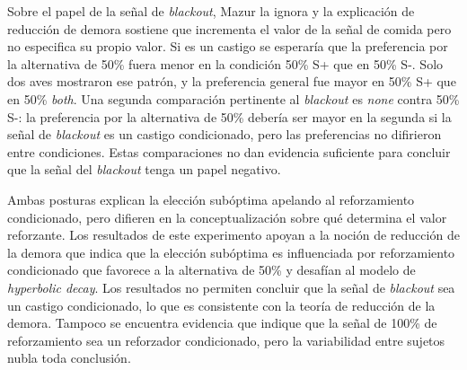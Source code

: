 \documentclass[a4paper,12pt]{article}
\begin{document}
Sobre el papel de la señal de {\itshape blackout}, Mazur la ignora y la explicación de reducción de demora sostiene que incrementa el valor de la señal de comida pero no especifica su propio valor. Si es un castigo se esperaría que la preferencia por la alternativa de 50\% fuera menor en la condición 50\% S+ que en 50\% S-. Solo dos aves mostraron ese patrón, y la preferencia general fue mayor en 50\% S+ que en 50\% {\itshape both}. Una segunda comparación pertinente al {\itshape blackout} es {\itshape none} contra 50\% S-: la preferencia por la alternativa de 50\% debería ser mayor en la segunda si la señal de {\itshape blackout} es un castigo condicionado, pero las preferencias no difirieron entre condiciones. Estas comparaciones no dan evidencia suficiente para concluir que la señal del {\itshape blackout} tenga un papel negativo.

Ambas posturas explican la elección subóptima apelando al reforzamiento condicionado, pero difieren en la conceptualización sobre qué determina el valor reforzante. Los resultados de este experimento apoyan a la noción de reducción de la demora que indica que la elección subóptima es influenciada por reforzamiento condicionado que favorece a la alternativa de 50\% y desafían al modelo de {\itshape hyperbolic decay}. Los resultados no permiten concluir que la señal de {\itshape blackout} sea un castigo condicionado, lo que es consistente con la teoría de reducción de la demora. Tampoco se encuentra evidencia que indique que la señal de 100\% de reforzamiento sea un reforzador condicionado, pero la variabilidad entre sujetos nubla toda conclusión.
\end{document}
